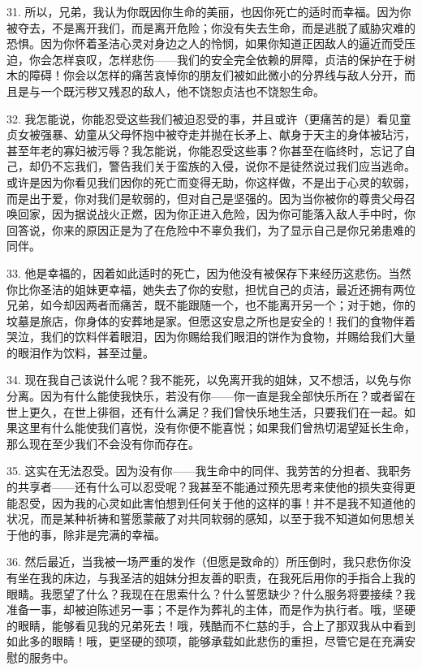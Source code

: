 31. 所以，兄弟，我认为你既因你生命的美丽，也因你死亡的适时而幸福。因为你被夺去，不是离开我们，而是离开危险；你没有失去生命，而是逃脱了威胁灾难的恐惧。因为你怀着圣洁心灵对身边之人的怜悯，如果你知道正因敌人的逼近而受压迫，你会怎样哀叹，怎样悲伤——我们的安全完全依赖的屏障，贞洁的保护在于树木的障碍！你会以怎样的痛苦哀悼你的朋友们被如此微小的分界线与敌人分开，而且是与一个既污秽又残忍的敌人，他不饶恕贞洁也不饶恕生命。\par

32. 我怎能说，你能忍受这些我们被迫忍受的事，并且或许（更痛苦的是）看见童贞女被强暴、幼童从父母怀抱中被夺走并抛在长矛上、献身于天主的身体被玷污，甚至年老的寡妇被污辱？我怎能说，你能忍受这些事？你甚至在临终时，忘记了自己，却仍不忘我们，警告我们关于蛮族的入侵，说你不是徒然说过我们应当逃命。或许是因为你看见我们因你的死亡而变得无助，你这样做，不是出于心灵的软弱，而是出于爱，你对我们是软弱的，但对自己是坚强的。因为当你被你的尊贵父母召唤回家，因为据说战火正燃，因为你正进入危险，因为你可能落入敌人手中时，你回答说，你来的原因正是为了在危险中不辜负我们，为了显示自己是你兄弟患难的同伴。\par

33. 他是幸福的，因着如此适时的死亡，因为他没有被保存下来经历这悲伤。当然你比你圣洁的姐妹更幸福，她失去了你的安慰，担忧自己的贞洁，最近还拥有两位兄弟，如今却因两者而痛苦，既不能跟随一个，也不能离开另一个；对于她，你的坟墓是旅店，你身体的安葬地是家。但愿这安息之所也是安全的！我们的食物伴着哭泣，我们的饮料伴着眼泪，因为你赐给我们眼泪的饼作为食物，并赐给我们大量的眼泪作为饮料，甚至过量。\par

34. 现在我自己该说什么呢？我不能死，以免离开我的姐妹，又不想活，以免与你分离。因为有什么能使我快乐，若没有你——你一直是我全部快乐所在？或者留在世上更久，在世上徘徊，还有什么满足？我们曾快乐地生活，只要我们在一起。如果这里有什么能使我们喜悦，没有你便不能喜悦；如果我们曾热切渴望延长生命，那么现在至少我们不会没有你而存在。\par

35. 这实在无法忍受。因为没有你——我生命中的同伴、我劳苦的分担者、我职务的共享者——还有什么可以忍受呢？我甚至不能通过预先思考来使他的损失变得更能忍受，因为我的心灵如此害怕想到任何关于他的这样的事！并不是我不知道他的状况，而是某种祈祷和誓愿蒙蔽了对共同软弱的感知，以至于我不知道如何思想关于他的事，除非是完满的幸福。\par

36. 然后最近，当我被一场严重的发作（但愿是致命的）所压倒时，我只悲伤你没有坐在我的床边，与我圣洁的姐妹分担友善的职责，在我死后用你的手指合上我的眼睛。我愿望了什么？我现在在思索什么？什么誓愿缺少？什么服务将要接续？我准备一事，却被迫陈述另一事；不是作为葬礼的主体，而是作为执行者。哦，坚硬的眼睛，能够看见我的兄弟死去！哦，残酷而不仁慈的手，合上了那双我从中看到如此多的眼睛！哦，更坚硬的颈项，能够承载如此悲伤的重担，尽管它是在充满安慰的服务中。\par

